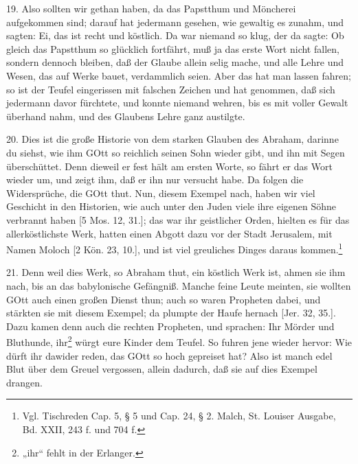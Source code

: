 19. Also sollten wir gethan haben, da das Papstthum und Möncherei aufgekommen sind; darauf hat jedermann gesehen, wie gewaltig es zunahm, und sagten: Ei, das ist recht und köstlich. Da war niemand so klug, der da sagte: Ob gleich das Papstthum so glücklich fortfährt, muß ja das erste Wort nicht fallen, sondern dennoch bleiben, daß der Glaube allein selig mache, und alle Lehre und Wesen, das auf Werke bauet, verdammlich seien. Aber das hat man lassen fahren; so ist der Teufel eingerissen mit falschen Zeichen und hat genommen, daß sich jedermann davor fürchtete, und konnte niemand wehren, bis es mit voller Gewalt überhand nahm, und des Glaubens Lehre ganz austilgte.

20. Dies ist die große Historie von dem starken Glauben des Abraham, darinne du siehst, wie ihm GOtt so reichlich seinen Sohn wieder gibt, und ihn mit Segen überschüttet. Denn dieweil er fest hält am ersten Worte, so fährt er das Wort wieder um, und zeigt ihm, daß er ihn nur versucht habe. Da folgen die Widersprüche, die GOtt thut. Nun, diesem Exempel nach, haben wir viel Geschicht in den Historien, wie auch unter den Juden viele ihre eigenen Söhne verbrannt haben [5 Mos. 12, 31.]; das war ihr geistlicher Orden, hielten es für das allerköstlichste Werk, hatten einen Abgott dazu vor der Stadt Jerusalem, mit Namen Moloch [2 Kön. 23, 10.], und ist viel greuliches Dinges daraus kommen.\footnote{Vgl. Tischreden Cap. 5, § 5 und Cap. 24, § 2. Malch, St. Louiser Ausgabe, Bd. XXII, 243 f. und 704 f.}

21. Denn weil dies Werk, so Abraham thut, ein köstlich Werk ist, ahmen sie ihm nach, bis an das babylonische Gefängniß. Manche feine Leute meinten, sie wollten GOtt auch einen großen Dienst thun; auch so waren Propheten dabei, und stärkten sie mit diesem Exempel; da plumpte der Haufe hernach [Jer. 32, 35.]. Dazu kamen denn auch die rechten Propheten, und sprachen: Ihr Mörder und Bluthunde, ihr\footnote{„ihr“ fehlt in der Erlanger.} würgt eure Kinder dem Teufel. So fuhren jene wieder hervor: Wie dürft ihr dawider reden, das GOtt so hoch gepreiset hat? Also ist manch edel Blut über dem Greuel vergossen, allein dadurch, daß sie auf dies Exempel drangen.

